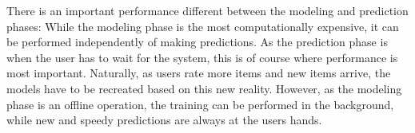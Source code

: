 There is an important performance different between the modeling and prediction phases:
While the modeling phase is the most computationally expensive,
it can be performed independently of making predictions.
As the prediction phase is when the user has to wait for the system,
this is of course where performance is most important.
Naturally, as users rate more items and new items arrive,
the models have to be recreated based on this new reality.
However, as the modeling phase is an offline operation,
the training can be performed in the background, while new
and speedy predictions are always at the users hands.



